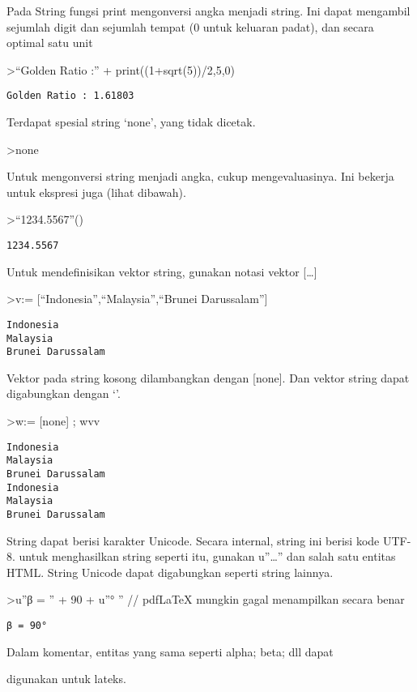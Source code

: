 \documentclass[
]{book}
\begin{document}
Pada String fungsi print mengonversi angka menjadi string. Ini dapat mengambil sejumlah digit dan sejumlah tempat (0 untuk keluaran padat), dan secara optimal satu unit

\textgreater{}``Golden Ratio :'' + print((1+sqrt(5))/2,5,0)

\begin{verbatim}
Golden Ratio : 1.61803
\end{verbatim}

Terdapat spesial string `none', yang tidak dicetak.

\textgreater none

Untuk mengonversi string menjadi angka, cukup mengevaluasinya. Ini bekerja untuk ekspresi juga (lihat dibawah).

\textgreater{}``1234.5567''()

\begin{verbatim}
1234.5567
\end{verbatim}

Untuk mendefinisikan vektor string, gunakan notasi vektor {[}\ldots{]}

\textgreater v:= {[}``Indonesia'',``Malaysia'',``Brunei Darussalam''{]}

\begin{verbatim}
Indonesia
Malaysia
Brunei Darussalam
\end{verbatim}

Vektor pada string kosong dilambangkan dengan {[}none{]}. Dan vektor string dapat digabungkan dengan `\textbar{}'.

\textgreater w:= {[}none{]} ; w\textbar v\textbar v

\begin{verbatim}
Indonesia
Malaysia
Brunei Darussalam
Indonesia
Malaysia
Brunei Darussalam
\end{verbatim}

String dapat berisi karakter Unicode. Secara internal, string ini berisi kode UTF-8. untuk menghasilkan string seperti itu, gunakan u''\ldots'' dan salah satu entitas HTML. String Unicode dapat digabungkan seperti string lainnya.

\textgreater u''β = '' + 90 + u''° '' // pdfLaTeX mungkin gagal menampilkan secara benar

\begin{verbatim}
β = 90° 
\end{verbatim}

Dalam komentar, entitas yang sama seperti alpha; beta; dll dapat

digunakan untuk lateks.
\end{document}
